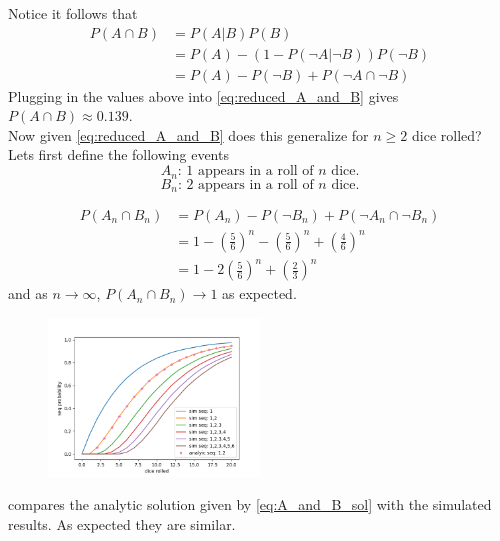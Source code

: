 \documentclass[12pt,a4paper]{article}
\begin{document}
Notice it follows that
\begin{align}
P(A \cap B)     &= P(A|B)P(B)\\
                &= P(A) - (1 - P(\neg A|\neg B)) P(\neg B)\\
                &= P(A) - P(\neg B) + P(\neg A \cap \neg B)
\label{eq:reduced_A_and_B}
\end{align}
Plugging in the values above into \cref{eq:reduced_A_and_B} gives $P(A \cap B) \approx 0.139$.\\

Now given \cref{eq:reduced_A_and_B} does this generalize for $n\geq 2$ dice rolled? Lets first define the following events
\begin{equation}
A_n \text{: 1 appears in a roll of $n$ dice.}
\end{equation}
\begin{equation}
B_n \text{: 2 appears in a roll of $n$ dice.}
\end{equation}

\begin{align}
P(A_n \cap B_n) &= P(A_n) - P(\neg B_n) + P(\neg A_n \cap \neg B_n)\\
                &=  1-\left(\frac{5}{6}\right)^n -\left(\frac{5}{6}\right)^n + \left(\frac{4}{6}\right)^n\\
                &= 1 - 2\left(\frac{5}{6}\right)^n + \left(\frac{2}{3}\right)^n
\label{eq:A_and_B_sol}
\end{align}
and as $n\to\infty$, $P(A_n \cap B_n) \to 1$ as expected.\\

\begin{figure}[H]
    \centering
    \includegraphics[width=0.5\textwidth]{figs/compare_analytic_sim.png}
    \caption{}
    \label{fig:compare_analytic_sim}
\end{figure}
 compares the analytic solution given by \cref{eq:A_and_B_sol} with the simulated results. As expected they are similar.\\
\end{document}
